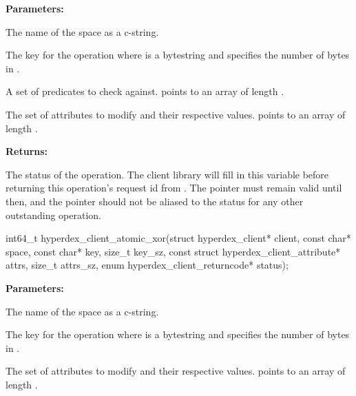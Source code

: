 \noindent\textbf{Parameters:}
\begin{description}[labelindent=\widthof{{\code{checks}, \code{checks\_sz}}},leftmargin=*,noitemsep,nolistsep,align=right]
\item[\code{space}] The name of the space as a c-string.
\item[\code{key}, \code{key\_sz}] The key for the operation where  is a bytestring and  specifies the number of bytes in .
\item[\code{checks}, \code{checks\_sz}] A set of predicates to check against.   points to an array of length .
\item[\code{attrs}, \code{attrs\_sz}] The set of attributes to modify and their respective values.   points to an array of length .
\end{description}

\noindent\textbf{Returns:}
\begin{description}[labelindent=\widthof{{\code{status}}},leftmargin=*,noitemsep,nolistsep,align=right]
\item[\code{status}] The status of the operation.  The client library will fill in this variable before returning this operation's request id from .  The pointer must remain valid until then, and the pointer should not be aliased to the status for any other outstanding operation.
\end{description}

\funcsep
{}
\begin{ccode}
int64_t hyperdex_client_atomic_xor(struct hyperdex_client* client,
                const char* space,
                const char* key, size_t key_sz,
                const struct hyperdex_client_attribute* attrs, size_t attrs_sz,
                enum hyperdex_client_returncode* status);
\end{ccode}
\funcdesc 

\noindent\textbf{Parameters:}
\begin{description}[labelindent=\widthof{{\code{attrs}, \code{attrs\_sz}}},leftmargin=*,noitemsep,nolistsep,align=right]
\item[\code{space}] The name of the space as a c-string.
\item[\code{key}, \code{key\_sz}] The key for the operation where  is a bytestring and  specifies the number of bytes in .
\item[\code{attrs}, \code{attrs\_sz}] The set of attributes to modify and their respective values.   points to an array of length .
\end{description}

